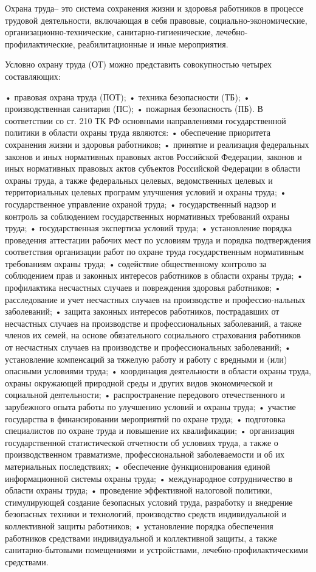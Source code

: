 Охрана труда– это система сохранения жизни и здоровья работников в процессе трудовой деятельности, включающая в себя правовые, социально-экономические, организационно-технические, санитарно-гигиенические, лечебно-профилактические, реабилитационные и иные мероприятия.

Условно охрану труда (ОТ) можно представить совокупностью четырех составляющих:

• правовая охрана труда (ПОТ);
• техника безопасности (ТБ);
• производственная санитария (ПС);
• пожарная безопасность (ПБ).
В соответствии со ст. 210 ТК РФ основными направлениями государственной политики в области охраны труда являются:
• обеспечение приоритета сохранения жизни и здоровья работников;
• принятие и реализация федеральных законов и иных нормативных правовых актов Российской Федерации, законов и иных нормативных правовых актов субъектов Российской Федерации в области охраны труда, а также федеральных целевых, ведомственных целевых и территориальных целевых программ улучшения условий и охраны труда;
• государственное управление охраной труда;
• государственный надзор и контроль за соблюдением государственных нормативных требований охраны труда;
• государственная экспертиза условий труда;
• установление порядка проведения аттестации рабочих мест по условиям труда и порядка подтверждения соответствия организации работ по охране труда государственным нормативным требованиям охраны труда;
• содействие общественному контролю за соблюдением прав и законных интересов работников в области охраны труда;
• профилактика несчастных случаев и повреждения здоровья работников;
• расследование и учет несчастных случаев на производстве и профессио-нальных заболеваний;
• защита законных интересов работников, пострадавших от несчастных случаев на производстве и профессиональных заболеваний, а также членов их семей, на основе обязательного социального страхования работников от несчастных случаев на производстве и профессиональных заболеваний;
• установление компенсаций за тяжелую работу и работу с вредными и (или) опасными условиями труда;
• координация деятельности в области охраны труда, охраны окружающей природной среды и других видов экономической и социальной деятельности;
• распространение передового отечественного и зарубежного опыта работы по улучшению условий и охраны труда;
• участие государства в финансировании мероприятий по охране труда;
• подготовка специалистов по охране труда и повышение их квалификации;
• организация государственной статистической отчетности об условиях труда, а также о производственном травматизме, профессиональной заболеваемости и об их материальных последствиях;
• обеспечение функционирования единой информационной системы охраны труда;
• международное сотрудничество в области охраны труда;
• проведение эффективной налоговой политики, стимулирующей создание безопасных условий труда, разработку и внедрение безопасных техники и технологий, производство средств индивидуальной и коллективной защиты работников;
• установление порядка обеспечения работников средствами индивидуальной и коллективной защиты, а также санитарно-бытовыми помещениями и устройствами, лечебно-профилактическими средствами.

